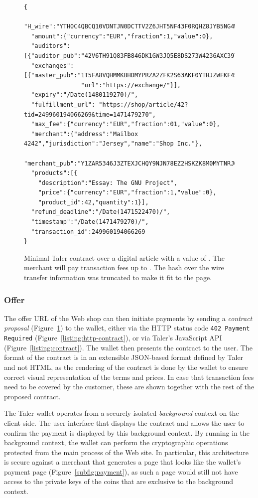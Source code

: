 \documentclass{llncs}
\begin{document}
\begin{figure}[t!]
  \lstset{language=JavaScript}
\begin{lstlisting}
{
  "H_wire":"YTH0C4QBCQ10VDNTJN0DCTTV2Z6JHT5NF43F0RQHZ8JYB5NG4W4G...",
  "amount":{"currency":"EUR","fraction":1,"value":0},
  "auditors":[{"auditor_pub":"42V6TH91Q83FB846DK1GW3JQ5E8DS273W4236AXC397892ESD0B0"}],
  "exchanges":[{"master_pub":"1T5FA8VQHMMKBHDMYPRZA2ZFK2S63AKF0YTHJZWFKF45K2JGC8H0",
                "url":"https://exchange/"}],
  "expiry":"/Date(1480119270)/",
  "fulfillment_url": "https://shop/article/42?tid=249960194066269&time=1471479270",
  "max_fee":{"currency":"EUR","fraction":01,"value":0},
  "merchant":{"address":"Mailbox 4242","jurisdiction":"Jersey","name":"Shop Inc."},
  "merchant_pub":"Y1ZAR5346J3ZTEXJCHQY9NJN78EZ2HSKZK8M0MYTNRJG5N0HD520",
  "products":[{
    "description":"Essay: The GNU Project",
    "price":{"currency":"EUR","fraction":1,"value":0},
    "product_id":42,"quantity":1}],
  "refund_deadline":"/Date(1471522470)/",
  "timestamp":"/Date(1471479270)/",
  "transaction_id":249960194066269
}
\end{lstlisting}
  \caption{Minimal Taler contract over a digital article with a value of . The merchant will pay transaction fees up to .  The hash over the wire transfer information was truncated to make it fit to the page.}
  \label{listing:json-contract}
\end{figure}

\subsubsection{Offer}

The offer URL of the Web shop can then initiate payments by sending a
\emph{contract proposal} (Figure~\ref{listing:json-contract}) to the
wallet, either via the HTTP status code {\tt 402 Payment Required}
(Figure~\ref{listing:http-contract}), or via Taler's JavaScript API
(Figure~\ref{listing:contract}).  The wallet then presents the
contract to the user.  The format of the contract is in an extensible
JSON-based format defined by Taler and not HTML, as the rendering of
the contract is done by the wallet to ensure correct visual
representation of the terms and prices.  In case that transaction fees
need to be covered by the customer, these are shown together with the
rest of the proposed contract.

The Taler wallet operates from a securely isolated {\em background}
context on the client side.  The user interface that displays the
contract and allows the user to confirm the payment is displayed by
this background context.  By running in the background context, the
wallet can perform the cryptographic operations protected from the
main process of the Web site.  In particular, this architecture is
secure against a merchant that generates a page that looks like the
wallet's payment page (Figure~\ref{subfig:payment}), as such a page
would still not have access to the private keys of the coins that are
exclusive to the background context.
\end{document}
